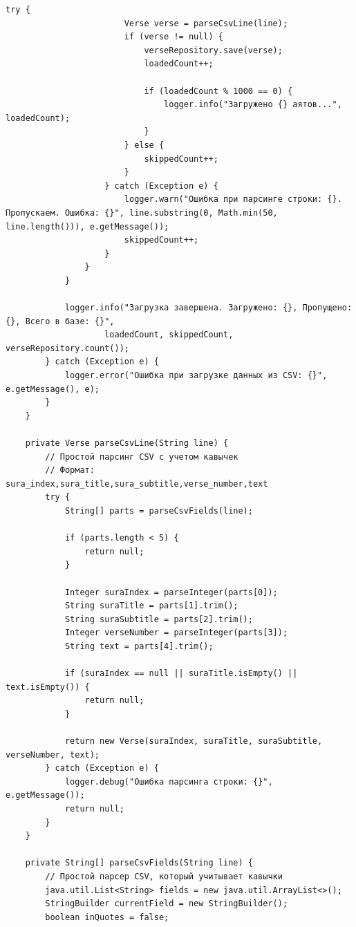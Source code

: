 \begin{lstlisting}[basicstyle=\tiny\ttfamily,breaklines=true]
                    try {
                        Verse verse = parseCsvLine(line);
                        if (verse != null) {
                            verseRepository.save(verse);
                            loadedCount++;
                            
                            if (loadedCount % 1000 == 0) {
                                logger.info("Загружено {} аятов...", loadedCount);
                            }
                        } else {
                            skippedCount++;
                        }
                    } catch (Exception e) {
                        logger.warn("Ошибка при парсинге строки: {}. Пропускаем. Ошибка: {}", line.substring(0, Math.min(50, line.length())), e.getMessage());
                        skippedCount++;
                    }
                }
            }

            logger.info("Загрузка завершена. Загружено: {}, Пропущено: {}, Всего в базе: {}", 
                    loadedCount, skippedCount, verseRepository.count());
        } catch (Exception e) {
            logger.error("Ошибка при загрузке данных из CSV: {}", e.getMessage(), e);
        }
    }

    private Verse parseCsvLine(String line) {
        // Простой парсинг CSV с учетом кавычек
        // Формат: sura_index,sura_title,sura_subtitle,verse_number,text
        try {
            String[] parts = parseCsvFields(line);
            
            if (parts.length < 5) {
                return null;
            }

            Integer suraIndex = parseInteger(parts[0]);
            String suraTitle = parts[1].trim();
            String suraSubtitle = parts[2].trim();
            Integer verseNumber = parseInteger(parts[3]);
            String text = parts[4].trim();

            if (suraIndex == null || suraTitle.isEmpty() || text.isEmpty()) {
                return null;
            }

            return new Verse(suraIndex, suraTitle, suraSubtitle, verseNumber, text);
        } catch (Exception e) {
            logger.debug("Ошибка парсинга строки: {}", e.getMessage());
            return null;
        }
    }

    private String[] parseCsvFields(String line) {
        // Простой парсер CSV, который учитывает кавычки
        java.util.List<String> fields = new java.util.ArrayList<>();
        StringBuilder currentField = new StringBuilder();
        boolean inQuotes = false;


\end{lstlisting}
